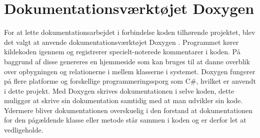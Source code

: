 \section{Dokumentationsværktøjet Doxygen}
For at lette dokumentationsarbejdet i forbindelse koden tilhørende projektet, blev det valgt at anvende dokumentationsværktøjet Doxygen \citep{doxygenWeb}. Programmet kører kildekoden igennem og registrerer specielt-noterede kommentarer i koden. På baggrund af disse genereres en hjemmeside som kan bruges til at danne overblik over opbygningen og relationerne i mellem klasserne i systemet. Doxygen fungerer på flere platforme og forskellige programmeringssporg som C\#, hvilket er anvendt i dette projekt. Med Doxygen skrives dokumentationen  i selve koden, dette muliggør at skrive sin dokumentation samtidig med at man udvikler sin kode. Ydermere bliver dokumentationen overskuelig i den forstand at dokumentationen for den pågældende klasse eller metode står sammen i koden og er derfor let at vedligeholde.